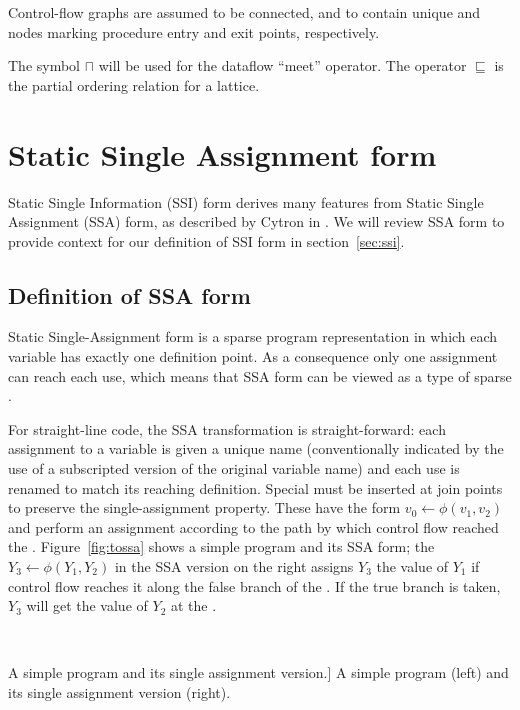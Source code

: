 \documentclass[12pt,titlepage,twoside]{article}
\newcommand{\meet}{\ensuremath{\sqcap}}
\newcommand{\latleq}{\ensuremath{\sqsubseteq}}
\let\oldsection\section
\renewcommand{\section}{\setcounter{figure}{0}\setcounter{table}{0}\oldsection}
\begin{document}
Control-flow graphs are assumed to be connected, and to contain unique
 and  nodes marking procedure entry and exit
points, respectively.

The symbol $\meet$ will be used for the dataflow ``meet'' operator.
The operator $\latleq$ is the %
partial ordering relation for a lattice.

\section{Static Single Assignment form}\label{sec:ssa}
Static Single Information (SSI) form derives many features from Static
Single Assignment (SSA) form, as described by Cytron in
\cite{cytron89:ssa}.  We will review SSA form to provide context for
our definition of SSI form in section~\ref{sec:ssi}.

\subsection{Definition of SSA form}

Static Single-Assignment form is a sparse program representation in
which each variable has exactly one definition point.  As a
consequence only one assignment can reach each use, which means that
SSA form can be viewed as a type of sparse 
\cite{aho88:dragon}.

For straight-line code, the SSA transformation is straight-forward:
each assignment to a variable is given a unique name (conventionally
indicated by the use of a subscripted version of the original variable
name) and each use is renamed to match its reaching definition.
Special  must be inserted at join points to
preserve the single-assignment property.  These  have
the form $v_0\gets\phi(v_1,v_2)$ and perform an assignment
according to the path by which control flow reached the \phifunction.
Figure~\vref{fig:tossa} shows a simple program and its SSA form; the
\phifunction $Y_3\gets\phi(Y_1,Y_2)$ in the SSA version on the
right assigns $Y_3$ the value of $Y_1$ if control flow reaches it
along the false branch of the .  If the true branch is taken,
$Y_3$ will get the value of $Y_2$ at the \phifunction.

\begin{myfigure}
\begin{center}
 \vline\ 
\end{center}
\caption
[A simple program and its single assignment version.]
{A simple program (left) and its single assignment version (right).
\label{fig:tossa}}
\end{myfigure}
\end{document}
